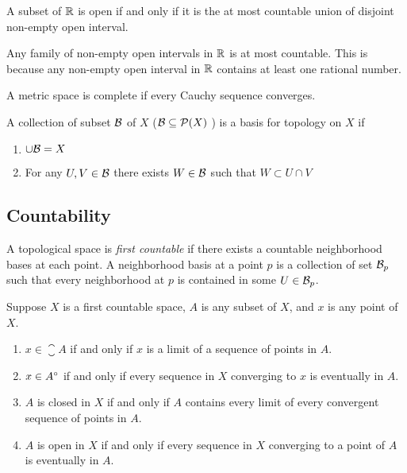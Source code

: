 \documentclass[twocolumn]{article}
\begin{document}
\begin{thm}
	A subset of $\mathbb{R}$ is open if and only if it is the at most countable union of disjoint non-empty open interval.
\end{thm}

\begin{remark}
	Any family of non-empty open intervals in $\mathbb{R}$ is at most countable. 
	This is because any non-empty open interval in $\mathbb{R}$ contains at least one rational number.
\end{remark}

\begin{defi}
	A metric space is complete if every Cauchy sequence converges.
\end{defi}

\begin{defi}
	A collection of subset $\mathcal{B}$ of $X$ ($\mathcal{B} \subseteq \mathcal{P}(X)$ ) is a basis for topology on $X$ if 
	\begin{enumerate}
		\item $\cup \mathcal{B} = X$
		\item For any $U, V \in \mathcal{B}$ there exists $W \in \mathcal{B}$ such that $W \subset  U \cap V$
	\end{enumerate}
\end{defi}

\subsection{Countability}

\begin{defi}
	A topological space is \emph{first countable} if there exists a countable neighborhood bases at each point.
	A neighborhood basis at a point $p$ is a collection of set $\mathcal{B}_p$ such that every neighborhood at $p$ is contained in some $U \in \mathcal{B}_p$.
\end{defi}

\begin{thm}
	Suppose $X$ is a first countable space, $A$ is any subset of $X$, and $x$ is any point of $X$.
	\begin{enumerate}
		\item $x \in \closure{A}$ if and only if $x$ is a limit of a sequence of points in $A$.
		\item $x \in A^{\circ}$ if and only if every sequence in $X$ converging to $x$ is eventually in $A$. 
		\item $A$ is closed in $X$ if and only if $A$ contains every limit of every convergent sequence of points in $A$.
		\item $A$ is open in $X$ if and only if every sequence in $X$ converging to a point of $A$ is eventually in $A$.
	\end{enumerate}
\end{thm}
\end{document}
